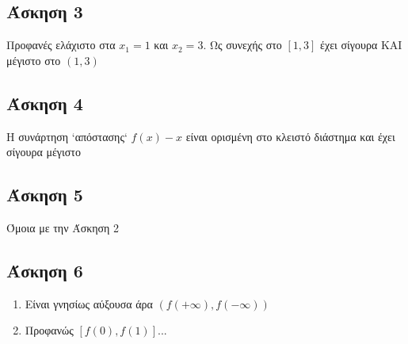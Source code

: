 \documentclass[greek]{beamer}
\begin{document}
\subsection{Άσκηση 3}
\begin{frame}[label=Λύση3]
 Προφανές ελάχιστο στα $x_1=1$ και $x_2=3$. Ως συνεχής στο $[1,3]$ έχει σίγουρα ΚΑΙ μέγιστο στο $(1,3)$

 \hyperlink{Άσκηση3}{}
\end{frame}

\subsection{Άσκηση 4}
\begin{frame}[label=Λύση4]
 Η συνάρτηση `απόστασης` $f(x)-x$ είναι ορισμένη στο κλειστό διάστημα και έχει σίγουρα μέγιστο

 \hyperlink{Άσκηση4}{}
\end{frame}

\subsection{Άσκηση 5}
\begin{frame}[label=Λύση5]
 Όμοια με την Άσκηση 2

 \hyperlink{Άσκηση5}{}
\end{frame}

\subsection{Άσκηση 6}
\begin{frame}[label=Λύση6]
 \begin{enumerate}
  \item Είναι γνησίως αύξουσα άρα $(f(+\infty),f(-\infty))$
  \item Προφανώς $[f(0),f(1)]$...
 \end{enumerate}

 \hyperlink{Άσκηση6}{}
\end{frame}
\end{document}
